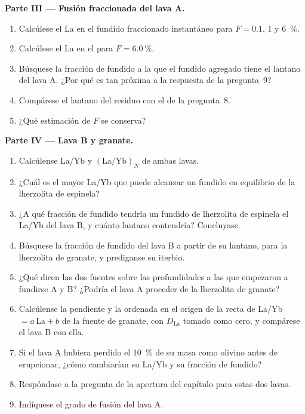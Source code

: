 \begin{problem}
\medskip\noindent\textbf{Parte III --- Fusión fraccionada del lava A.}
\begin{enumerate}[resume]
\item Calcúlese el La en el fundido fraccionado instantáneo para $F = 0.1$, 1 y
\qty{6}{\percent}.
\item Calcúlese el La en el  para $F = \qty{6.0}{\percent}$.
\item Búsquese la fracción de fundido a la que el fundido agregado tiene el lantano del
lava A. ¿Por qué es tan próxima a la respuesta de la pregunta~9?
\item Compárese el lantano del residuo con el de la pregunta~8.
\item ¿Qué estimación de $F$ se conserva?
\end{enumerate}

\medskip\noindent\textbf{Parte IV --- Lava B y granate.}
\begin{enumerate}[resume]
\item Calcúlense La/Yb y $(\mathrm{La}/\mathrm{Yb})_N$ de ambas lavas.
\item ¿Cuál es el mayor La/Yb que puede
alcanzar un fundido en equilibrio de la lherzolita de espinela?
\item ¿A qué fracción de fundido tendría un fundido de lherzolita de espinela el La/Yb del
lava B, y cuánto lantano contendría? Concluyase.
\item Búsquese la fracción de fundido del lava B a partir de su lantano, para la
lherzolita de granate, y prediganse su iterbio.
\item ¿Qué dicen las dos fuentes sobre las profundidades a las que empezaron a
fundirse A y B? ¿Podría el lava A proceder de la lherzolita de granate?
\item Calcúlense la pendiente y la ordenada en el origen de la recta de  La/Yb $= a\,
\mathrm{La} + b$ de la fuente de granate, con $D_{\mathrm{La}}$ tomado como cero,
y compárese el lava B con ella.
\item Si el lava A hubiera perdido el \qty{10}{\percent} de su masa como olivino antes de
erupcionar, ¿cómo cambiarían su La/Yb y su fracción de fundido?
\item Respóndase a la pregunta de la apertura del capítulo para estas dos lavas.
\item Indíquese el grado de fusión del lava A.
\end{enumerate}
\end{problem}
